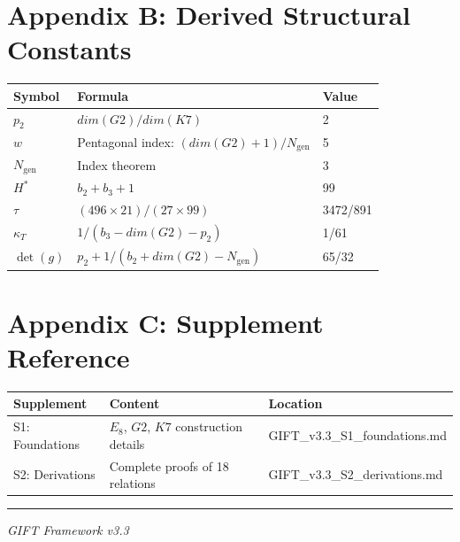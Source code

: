 \documentclass[11pt,a4paper]{article}
\newcommand{\E}{\mathrm{E}}
\newcommand{\Gtwo}{\mathrm{G}_2}
\newcommand{\Kseven}{K_7}
\newcommand{\dimE}{\mathrm{dim}}
\def\Gtwo{G2}%
\def\Kseven{K7}%
\def\E{E}%
\def\dimE{dim}%
\begin{document}
\section*{Appendix B: Derived Structural Constants}

\begin{table}[H]
\centering
\begin{tabular}{lll}
\toprule
Symbol & Formula & Value \\
\midrule
$p_2$ & $\dimE(\Gtwo)/\dimE(\Kseven)$ & 2 \\
$w$ & Pentagonal index: $(\dimE(\Gtwo)+1)/N_{\mathrm{gen}}$ & 5 \\
$N_{\mathrm{gen}}$ & Index theorem & 3 \\
$H^*$ & $b_2 + b_3 + 1$ & 99 \\
$\tau$ & $(496 \times 21)/(27 \times 99)$ & 3472/891 \\
$\kappa_T$ & $1/(b_3 - \dimE(\Gtwo) - p_2)$ & 1/61 \\
$\det(g)$ & $p_2 + 1/(b_2 + \dimE(\Gtwo) - N_{\mathrm{gen}})$ & 65/32 \\
\bottomrule
\end{tabular}
\end{table}

\section*{Appendix C: Supplement Reference}

\begin{table}[H]
\centering
\begin{tabular}{lll}
\toprule
Supplement & Content & Location \\
\midrule
S1: Foundations & $\E_8$, $\Gtwo$, $\Kseven$ construction details & GIFT\_v3.3\_S1\_foundations.md \\
S2: Derivations & Complete proofs of 18 relations & GIFT\_v3.3\_S2\_derivations.md \\
\bottomrule
\end{tabular}
\end{table}

\vfill
\noindent\rule{\textwidth}{0.2pt}
\textit{GIFT Framework v3.3}\\
\end{document}
